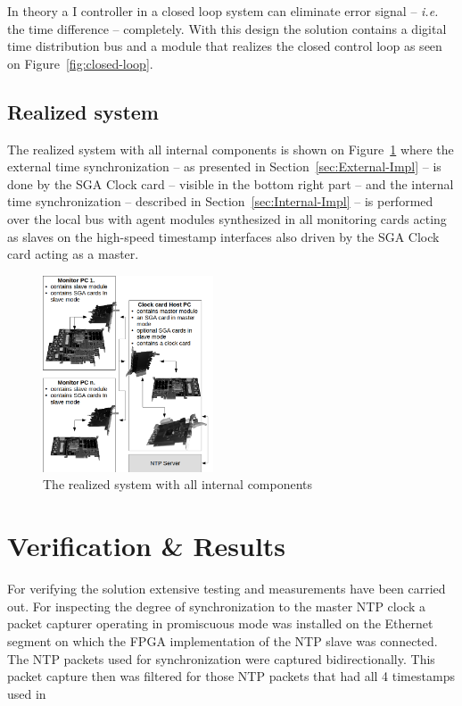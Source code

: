 \documentclass[journal]{IEEEtran}
\begin{document}
In theory a I controller in a closed loop system can eliminate error signal -- \emph{i.e.} the time difference --
completely.
With this design the solution contains a digital time distribution bus and a module that realizes the
closed control loop as seen on Figure~\ref{fig:closed-loop}.

\subsection{Realized system}

The realized system with all internal components is shown on Figure~\ref{fig:realized-system} where the external time
synchronization -- as presented in Section~\ref{sec:External-Impl} -- is done by the SGA Clock card -- visible in the
bottom right part -- and the internal time synchronization -- described in Section~\ref{sec:Internal-Impl} --
is performed over the local bus with agent modules synthesized in all monitoring cards acting as slaves on the
high-speed timestamp interfaces also driven by the SGA Clock card acting as a master.

\begin{figure}[H]
    \centering
    \includegraphics[width=0.45\textwidth]{figures_raw/clock_architecture.png}
    \caption{The realized system with all internal components}
    \label{fig:realized-system}
\end{figure}

\section{Verification \& Results}


For verifying the solution extensive testing and measurements have been carried out. For inspecting the degree of
synchronization to the master NTP clock a packet capturer operating in promiscuous mode was installed on the Ethernet
segment on which the FPGA implementation of the NTP slave was connected. The NTP packets used for synchronization were
captured bidirectionally. This packet capture then was filtered for those NTP packets that had all 4 timestamps used in
\end{document}
